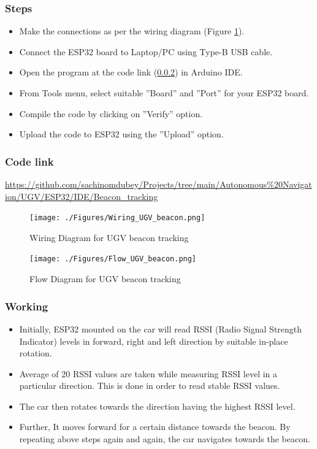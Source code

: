 \documentclass[a4paper,twoside]{iiththesis}
\begin{document}
\subsubsection{Steps}
\begin{itemize}
    \item Make the connections as per the wiring diagram (Figure \ref{Wiring_UGV_beacon}).
    \item Connect the ESP32 board to Laptop/PC using Type-B USB cable.
    \item Open the program at the code link (\ref{code_link_ESP32_beacon}) in Arduino IDE.
    \item From Tools menu, select suitable ”Board” and ”Port” for your ESP32 board.
    \item Compile the code by clicking on ”Verify” option.
    \item Upload the code to ESP32 using the ”Upload” option.
\end{itemize}

\subsubsection{{Code link}} \label{code_link_ESP32_beacon}
\begin{tcolorbox}
\url{https://github.com/sachinomdubey/Projects/tree/main/Autonomous\%20Navigation/UGV/ESP32/IDE/Beacon_tracking}
\end{tcolorbox}

\begin{figure}[h!]
\caption{Wiring Diagram for UGV beacon tracking}
\label{Wiring_UGV_beacon}
\centering
\texttt{[image: ./Figures/Wiring\_UGV\_beacon.png]}
\end{figure}

\begin{figure}[h!]
\caption{Flow Diagram for UGV beacon tracking}
\label{Flow_UGV_beacon}
\centering
\texttt{[image: ./Figures/Flow\_UGV\_beacon.png]}
\end{figure}

\subsubsection{Working}
\begin{itemize}
    \item Initially, ESP32 mounted on the car will read RSSI (Radio Signal Strength Indicator) levels in forward, right and left direction by suitable in-place rotation.
    \item Average of 20 RSSI values are taken while measuring RSSI level in a particular direction. This is done in order to read stable RSSI
    values.
    \item The car then rotates towards the direction having the highest RSSI level.
    \item Further, It moves forward for a certain distance towards the beacon. By repeating above steps again and again, the car navigates towards the beacon.
\end{itemize}
\end{document}
